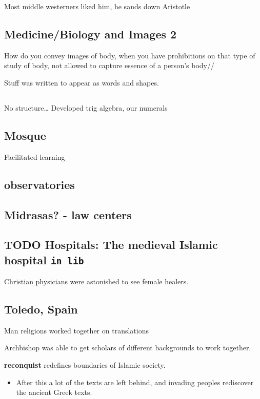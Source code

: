 \documentclass[11pt]{article}
\begin{document}
Most middle westerners liked him, he sands down Aristotle

\subsection{Medicine/Biology and Images 2}
\label{sec-8-13}
How do you convey images of body, when you have prohibitions on that type of study of body, not allowed to capture essence of a person's body//

Stuff was written to appear as words and shapes.
\subsection{}
\label{sec-8-14}
No structure\ldots{} Developed trig algebra, our numerals

\subsection{Mosque}
\label{sec-8-15}
Facilitated learning 
\subsection{observatories}
\label{sec-8-16}

\subsection{Midrasas? - law centers}
\label{sec-8-17}


\subsection{{\bfseries\sffamily TODO} Hospitals: The medieval Islamic hospital \texttt{in lib}}
\label{sec-8-18}
Christian physicians were astonished to see female healers.

\subsection{Toledo, Spain}
\label{sec-8-19}
Man religions worked together on translations

Archbishop was able to get scholars of different backgrounds to work together.

\textbf{reconquist} redefines boundaries of Islamic society.
\begin{itemize}
\item After this a lot of the texts are left behind, and invading peoples rediscover the ancient Greek texts.
\end{itemize}
\end{document}
